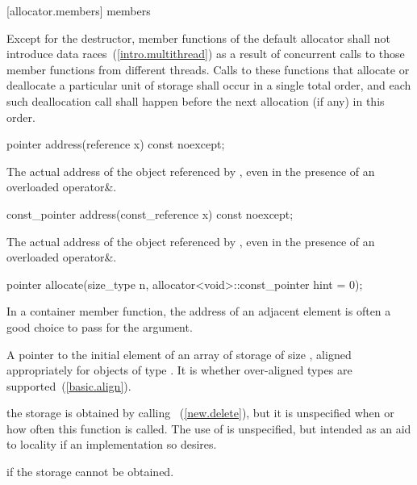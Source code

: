 [allocator.members]{ members}

\pnum
Except for the destructor, member functions of the default allocator shall not introduce
data races~(\ref{intro.multithread}) as a result of concurrent calls to those member
functions from different threads. Calls to these functions that allocate or deallocate a
particular unit of storage shall occur in a single total order, and each such
deallocation call shall happen before the next allocation (if any) in this order.

\begin{itemdecl}
pointer address(reference x) const noexcept;
\end{itemdecl}

\begin{itemdescr}
\pnum
\returns
The actual address of the object referenced by , even in the presence of an
overloaded operator\&.
\end{itemdescr}

\begin{itemdecl}
const_pointer address(const_reference x) const noexcept;
\end{itemdecl}

\begin{itemdescr}
\pnum
\returns
The actual address of the object referenced by , even in the presence of an
overloaded operator\&.
\end{itemdescr}

\begin{itemdecl}
pointer allocate(size_type n, allocator<void>::const_pointer hint = 0);
\end{itemdecl}

\begin{itemdescr}
\pnum
\enternote In a container member function, the address of an adjacent
element is often a good choice to pass for the  argument. \exitnote

\pnum
\returns
A pointer to the initial element of an array of storage of size 
, aligned appropriately for objects of type .
It is  whether over-aligned types are
supported~(\ref{basic.align}).

\pnum
\note
the storage is obtained by calling ~(\ref{new.delete}), but it is unspecified when or how often this
function is called. The use of  is unspecified, but intended as an aid to
locality if an implementation so desires.

\pnum
\throws
{} if the storage cannot be obtained.
\end{itemdescr}

